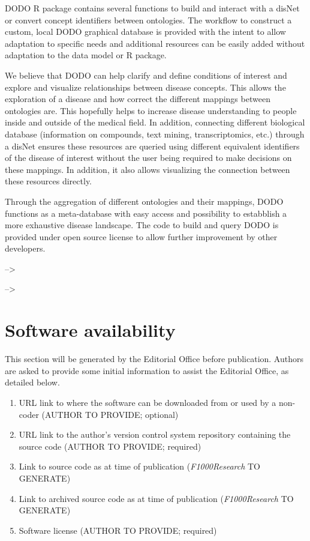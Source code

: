 \documentclass[9pt,a4paper,]{extarticle}
\begin{document}
DODO R package contains several functions to build and interact with a disNet or convert concept identifiers between ontologies. The workflow to construct a custom, local DODO graphical database is provided with the intent to allow adaptation to specific needs and additional resources can be easily added without adaptation to the data model or R package.

We believe that DODO can help clarify and define conditions of interest and explore and visualize relationships between disease concepts. This allows the exploration of a disease and how correct the different mappings between ontologies are. This hopefully helps to increase disease understanding to people inside and outside of the medical field. In addition, connecting different biological database (information on compounds, text mining, transcriptomics, etc.) through a disNet ensures these resources are queried using different equivalent identifiers of the disease of interest without the user being required to make decisions on these mappings. In addition, it also allows visualizing the connection between these resources directly.

Through the aggregation of different ontologies and their mappings, DODO functions as a meta-database with easy access and possibility to estabblish a more exhaustive disease landscape. The code to build and query DODO is provided under open source license to allow further improvement by other developers.

--\textgreater{}

--\textgreater{}

\hypertarget{software-availability}{%
\section{Software availability}\label{software-availability}}

This section will be generated by the Editorial Office before publication. Authors are asked to provide some initial information to assist the Editorial Office, as detailed below.

\begin{enumerate}
\def\labelenumi{\arabic{enumi}.}
\item
  URL link to where the software can be downloaded from or used by a non-coder (AUTHOR TO PROVIDE; optional)
\item
  URL link to the author's version control system repository containing the source code (AUTHOR TO PROVIDE; required)
\item
  Link to source code as at time of publication (\emph{F1000Research} TO GENERATE)
\item
  Link to archived source code as at time of publication (\emph{F1000Research} TO GENERATE)
\item
  Software license (AUTHOR TO PROVIDE; required)
\end{enumerate}
\end{document}
